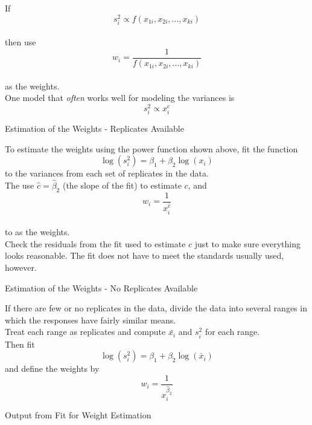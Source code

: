 {{If \[ s_i^2 \propto f(x_{1i},x_{2i},\ldots,x_{ki}) \] \\
then use \\
\[ w_i = \frac{1}{f(x_{1i},x_{2i},\ldots,x_{ki})} \] \\
as the weights. \\
\vspace{0.5in}
One model that {\em often} works well for modeling the variances is
\[ s_i^2 \propto x_i^c \]
\begin{figure}
\end{figure}
\newpage
\begin{center}
Estimation of the Weights - Replicates Available
\end{center}
\vspace{0.5in}
To estimate the weights using the power function
shown above, fit the function
\[ \log(s_i^2) = \beta_1 + \beta_2\log(x_i) \]
to the variances from each set of replicates in the
data. \\
\vspace{0.5in}
The use $\hat{c} = \hat{\beta}_2$ (the slope of the fit)
to estimate $c$, and \\
\[ w_i = \frac{1}{x^{\hat{c}}_i} \] \\
to as the weights. \\
\vspace{0.5in}
Check the residuals from the fit used to estimate $c$ just
to make sure everything looks reasonable.  The fit does not
have to meet the standards usually used, however. 
\newpage
\begin{center}
Estimation of the Weights - No Replicates Available
\end{center}
\vspace{0.5in}
If there are few or no replicates in the data, divide the
data into several ranges in which the responses have 
fairly similar means. \\
\vspace{0.5in}
Treat each range as replicates and
compute $\bar{x_i}$ and $s_i^2$ for each range. \\
\vspace{0.5in}
Then fit 
\[ \log(s_i^2) = \beta_1 + \beta_2\log(\bar{x}_i) \]
and define the weights by
\[ w_i = \frac{1}{x^{\hat{\beta}_2}_i} \]
\begin{figure}
\end{figure}
\clearpage
\newpage
\begin{center}
Output from Fit for Weight Estimation
\end{center}
\vspace{0.5in}
{\large
\begin{verbatim}


\end{verbatim}}}}

